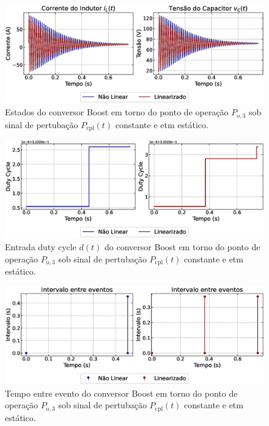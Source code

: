 \begin{figure}[H]
  \centering
  \captionsetup{justification=centering}
  \includegraphics[width=1.\textwidth]{figuras/dynamic-etm/boost/sim1/op1/result.eps}
  \caption{Estados do conversor Boost em torno do ponto de operação $P_{\mathrm{o}, 3}$ sob sinal de pertubação $P_{\mathrm{cpl}}(t)$ constante e \acrshort{etm} estático.}
\end{figure}

\begin{figure}[H]
  \centering
  \captionsetup{justification=centering}
  \includegraphics[width=1.\textwidth]{figuras/dynamic-etm/boost/sim1/op1/duty-cycle.eps}
  \caption{Entrada duty cycle $d(t)$ do conversor Boost em torno do ponto de operação $P_{\mathrm{o}, 3}$ sob sinal de pertubação $P_{\mathrm{cpl}}(t)$ constante e \acrshort{etm} estático.}
\end{figure}

\begin{figure}[H]
  \centering
  \captionsetup{justification=centering}
  \includegraphics[width=1.\textwidth]{figuras/dynamic-etm/boost/sim1/op1/inter-event-times.eps}
  \caption{Tempo entre evento do conversor Boost em torno do ponto de operação $P_{\mathrm{o}, 3}$ sob sinal de pertubação $P_{\mathrm{cpl}}(t)$ constante e \acrshort{etm} estático.}
\end{figure}

